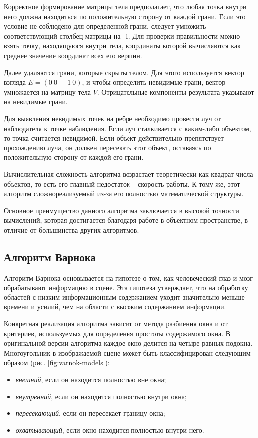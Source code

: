 Корректное формирование матрицы тела предполагает, что любая точка внутри него должна находиться по положительную сторону от каждой грани. Если это условие не соблюдено для определенной грани, следует умножить соответствующий столбец матрицы на -1. Для проверки правильности можно взять точку, находящуюся внутри тела, координаты которой вычисляются как среднее значение координат всех его вершин.

Далее удаляются грани, которые скрыты телом. Для этого используется вектор взгляда $E = (0 \ 0 \ -1 \ 0)$, и чтобы определить невидимые грани, вектор умножается на матрицу тела $V$. Отрицательные компоненты результата указывают на невидимые грани.

Для выявления невидимых точек на ребре необходимо провести луч от наблюдателя к точке наблюдения. Если луч сталкивается с каким-либо объектом, то точка считается невидимой. Если объект действительно препятствует прохождению луча, он должен пересекать этот объект, оставаясь по положительную сторону от каждой его грани.

Вычислительная сложность алгоритма возрастает теоретически как квадрат числа объектов, то есть его главный недостаток -- скорость работы. К тому же, этот алгоритм сложнореализуемый из-за его полностью математической структуры.

Основное преимущество данного алгоритма заключается в высокой точности вычислений, которая достигается благодаря работе в объектном пространстве, в отличие от большинства других алгоритмов.

\subsection{Алгоритм Варнока}

Алгоритм Варнока основывается на гипотезе о том, как человеческий глаз и мозг обрабатывают информацию в сцене. Эта гипотеза утверждает, что на обработку областей с низким информационным содержанием уходит значительно меньше времени и усилий, чем на области с высоким содержанием информации.

Конкретная реализация алгоритма зависит от метода разбиения окна и от критериев, используемых для определения простоты содержимого окна. В оригинальной версии алгоритма каждое окно делится на четыре равных подокна. Многоугольник в изображаемой сцене может быть классифицирован следующим образом (рис. \ref{fig:varnok-models}):
\begin{itemize}[label=--]
	\item \textit{внешний}, если он находится полностью вне окна;
	\item \textit{внутренний}, если он находится полностью внутри окна;
	\item \textit{пересекающий}, если он пересекает границу окна;
	\item \textit{охватывающий}, если окно находится полностью внутри него.
\end{itemize}

